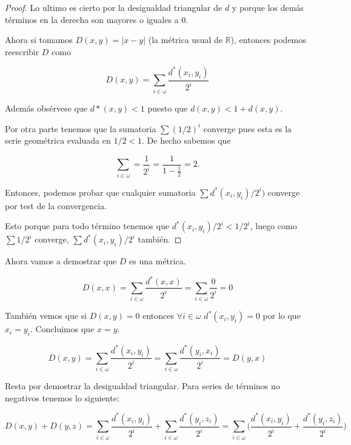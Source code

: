 \documentclass[letter,twoside,12pt]{article}
\begin{document}
\begin{enumerate}
\begin{proof}
Lo ultimo es cierto por la desigualdad triangular de $ d $ y porque los demás términos en la derecha son mayores o iguales a 0. 

Ahora si tomamos $ D(x,y) = |x-y|  $ (la métrica usual de $ \mathbb{R} $), entonces podemos reescribir $ D $ como

\begin{equation}
D(x,y)=\sum_{i \in \omega} \frac{d^*(x_i,y_i)}{2^{i}} \nonumber
\end{equation}

Además obsérvese que $ d*(x,y)<1 $ puesto que $d(x,y)<1+d(x,y)$.

Por otra parte tenemos que la sumatoria $ \sum {(1/2)^i} $ converge pues esta es la serie geométrica evaluada en $ 1/2<1 $. De hecho sabemos que

\begin{equation}
\sum_{i \in \omega} = \frac{1}{2^i}=\frac{1}{1-\frac{1}{2}}=2.\nonumber 
\end{equation}

Entonces, podemos probar que cualquier sumatoria $ \sum d^*(x_i,y_i)/2^i) $ converge por test de la convergencia.

Esto porque para todo término tenemos que $ d^*(x_i,y_i)/2^i<1/2^i $, luego como $ \sum 1/2^i$ converge, $ \sum d^*(x_i,y_i)/2^i $ también. 
\end{proof}

Ahora vamos a demostrar que $ D $ es una métrica.

\begin{equation}
D(x,x)= \sum_{i \in \omega} \frac{d^*(x,x)}{2^i}=\sum_{i \in \omega}\frac{0}{2^i}=0 \nonumber
\end{equation}

También vemos que si $D(x,y)=0$ entonces $ \forall i \in \omega $ $d^*(x_i,y_i)=0$ por lo que $x_i=y_i$. Concluimos que $ x = y $.

\begin{equation}
D(x,y)= \sum_{i \in \omega} \frac{d^*(x_i,y_i)}{2^i} = \sum_{i \in \omega} \frac{d^*(y_i,x_i)}{2^i} = D(y,x)\nonumber
\end{equation}

Resta por demostrar la desigualdad triangular. Para series de términos no negativos tenemos lo siguiente:

\begin{equation}
D(x,y)+D(y,z)=\sum_{i \in \omega} \frac{d^*(x_i,y_i)}{2^i} + \sum_{i \in \omega} \frac{d^*(y_i,z_i)}{2^i}= \sum_{i \in \omega} \Big(\frac{d^*(x_i,y_i)}{2^i}+\frac{d^*(y_i,z_i)}{2^i}\Big) \nonumber
\end{equation}


\end{enumerate}
\end{document}
